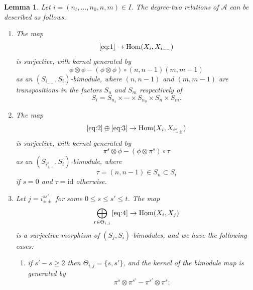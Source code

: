 \documentclass[11pt]{article}
\renewcommand{\labelenumi}{(\arabic{enumi})}
\theoremstyle{plain}
\newtheorem{lemma}{Lemma}[section]
\theoremstyle{nonumberplain}
\theoremstyle{plain}
\theoremstyle{nonumberplain}
\newcommand\cA{\mathcal A}
\DeclareMathOperator{\Hom}{\mathrm{Hom}}
\begin{document}
\begin{lemma}\label{le.rel}
  Let $i=\left(n_t,\ldots,n_0,n,m\right)\in I$. The degree-two relations of
  $\cA$ can be described as follows.
  \begin{enumerate}
    \renewcommand{\labelenumi}{(\alph{enumi})}
  \item The map
    \begin{equation*}
      \Cref{eq:1}\to \Hom(X_i,X_{i_{--}})
    \end{equation*}
    is surjective, with kernel generated by
    \begin{equation*}
      \phi\otimes\phi -(\phi\otimes\phi)\circ(n,n-1)(m,m-1)
    \end{equation*}
    as an $(S_{i_{--}},S_i)$-bimodule, where $(n,n-1)$ and
    $(m,m-1)$ are transpositions in the factors $S_{n}$ and $S_m$
    respectively of
    \begin{equation*}
      S_i = S_{n_t}\times \cdots\times S_{n_0}\times S_{n}\times S_m. 
    \end{equation*}
  \item The map
    \begin{equation*}
      \Cref{eq:2}\oplus \Cref{eq:3}\to \Hom(X_i,X_{i^s_{-\pm}})
    \end{equation*}
    is surjective, with kernel generated by
    \begin{equation*}
      \pi^s\otimes\phi - (\phi\otimes\pi^s)\circ \tau
    \end{equation*}
    as an $(S_{i^s_{\pm-}},S_i)$-bimodule, where
    \begin{equation*}
      \tau=(n,n-1)\in S_{n}\subset S_i
    \end{equation*}
    if $s=0$ and $\tau=\mathrm{id}$ otherwise.
  \item Let $j=i^{ss'}_{\pm\pm}$ for some $0\le s\le s'\le t$. The map
    \begin{equation}\label{eq:comp}
      \bigoplus_{r\in \Theta_{i,j}}\Cref{eq:4}\to \Hom(X_i,X_j)
    \end{equation}
    is a surjective morphism of $(S_j,S_i)$-bimodules, and we have the
    following cases:
    \begin{enumerate}
      \renewcommand{\labelenumii}{(\arabic{enumii})}
    \item if $s'-s\ge 2$ then $\Theta_{i,j}=\{s,s'\}$, and the
      kernel of the bimodule map  is generated by
      \begin{equation*}
        \pi^s\otimes\pi^{s'}-\pi^{s'}\otimes \pi^s; 
      \end{equation*}

\end{enumerate}
\end{enumerate}
\end{lemma}
\end{document}

